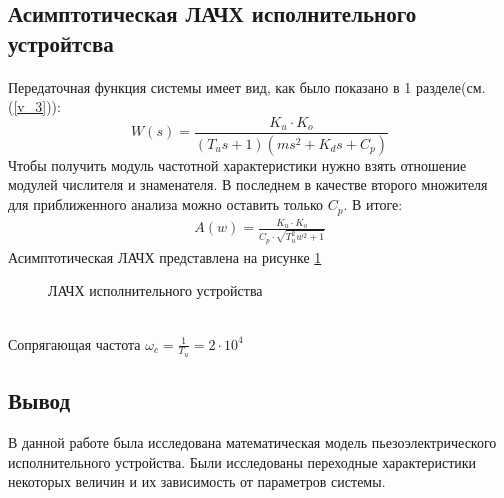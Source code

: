 \documentclass[a4paper,12pt]{article}
\begin{document}
	\newpage
	\begin{center}
		\section{Асимптотическая ЛАЧХ исполнительного устройтсва}
	\end{center}
	\paragraph{}
	Передаточная функция системы имеет вид, как было показано в 1 разделе(см. (\ref{v_3})):
	\begin{equation*}
	 W(s)=\frac{K_u\cdot K_o}{(T_u s+1)(ms^2+K_d s+C_p)}
	\end{equation*}
	Чтобы получить модуль частотной характеристики нужно взять отношение модулей числителя и знаменателя. В последнем в качестве второго множителя для приближенного анализа можно оставить только $C_p$. В итоге:
	\begin{gather}
	\displaystyle
	A(w)=\frac{K_u\cdot K_o}{C_p\cdot \sqrt{T_u^2 w^2+1}}
	\end{gather}	
	Асимптотическая ЛАЧХ представлена на рисунке \ref{s_7}
	\begin{figure}[h!]
			
		\centering
		
		\caption{ЛАЧХ исполнительного устройства}
			\label{s_7}
	\end{figure}
	\\
	Сопрягающая частота $\displaystyle \omega_c=\frac{1}{T_u}=2\cdot10^4$
		\newpage
	\begin{center}
		\section*{Вывод} 
	\end{center}
	\par
	В данной работе была исследована математическая модель пьезоэлектрического исполнительного устройства. Были исследованы переходные характеристики некоторых величин и их зависимость от параметров системы.
\end{document}
